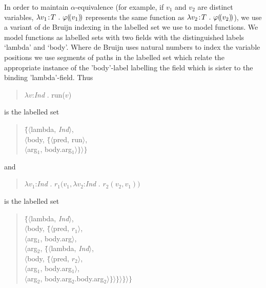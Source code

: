 In order to maintain $\alpha$-equivalence (for example, if $v_1$ and
$v_2$ are distinct variables, $\lambda v_1\!:\!T\ .\ \varphi\dep{v_1}$
represents the same function as $\lambda v_2\!:\!T\ .\
\varphi(\!(v_2)\!)$), we use a variant of de Bruijn indexing
\citep{deBruijn1972} in the labelled set we use to model functions.
We model functions as labelled sets with two fields with the
distinguished labels `lambda' and `body'.
Where de Bruijn uses natural numbers to index the variable positions
we use segments of paths in the labelled set which relate the
appropriate instance of the 'body'-label labelling the field which is
sister to the binding 'lambda'-field.  Thus
\begin{quote}
  $\lambda v$:\textit{Ind} . run($v$)
\end{quote}
is the labelled set
\begin{quote}
  \begin{tabbing}
    $\{$\=$\langle$lambda, \textit{Ind}$\rangle$,\\
    \>$\langle$body, $\{$\=$\langle$pred, run$\rangle$,\\
    \>\>                  $\langle$arg$_1$, body.arg$_1\rangle\}\rangle\}$
  \end{tabbing}
\end{quote}
and
\begin{quote}
  $\lambda v_1$:\textit{Ind} . $r_1(v_1,\lambda v_2$:\textit{Ind}
  . $r_2(v_2,v_1))$
\end{quote}
is the labelled set
\begin{quote}
  \begin{tabbing}
    $\{$\=$\langle$lambda, \textit{Ind}$\rangle$,\\
    \>   $\langle$body, $\{$\=$\langle$pred, $r_1\rangle$,\\
    \>\>                     $\langle$arg$_1$, body.arg$\rangle$,\\
    \>\>                     $\langle$arg$_2$, $\{$\=$\langle$lambda, \textit{Ind}$\rangle$,\\
    \>\>\>                                          $\langle$body, $\{$\=$\langle$pred, $r_2\rangle$,\\
    \>\>\>\>                                                            $\langle$arg$_1$, body.arg$_1\rangle$,\\
    \>\>\>\>                                                            $\langle$arg$_2$, body.arg$_2$.body.arg$_2\rangle\}\rangle\}\rangle\}\rangle\}$
  \end{tabbing}
\end{quote}





